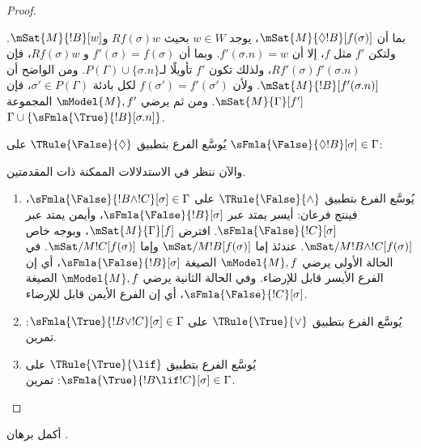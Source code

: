 \documentclass[../../../include/open-logic-section]{subfiles}
\begin{document}
\begin{proof}
\begin{enumerate}
{{  بما أن $\mSat{M}{\Diamond !B}[f(\sigma)]$، يوجد $w \in W$ بحيث
  $Rf(\sigma)w$ و$\mSat{M}{!B}[w]$. ولتكن $f'$ مثل $f$، إلا أن
  $f'(\sigma.n) = w$. وبما أن $f'(\sigma) = f(\sigma)$ و
  $Rf(\sigma)w$، فإن $Rf'(\sigma)f'(\sigma.n)$، ولذلك تكون $f'$
  تأويلًا لـ$P(\Gamma) \cup \{\sigma.n\}$. ومن الواضح أن
  $\mSat{M}{!B}[f'(\sigma.n)]$. ولأن $f(\sigma') = f'(\sigma')$ لكل
  بادئة $\sigma' \in P(\Gamma)$، فإن $\mSat{M}{\Gamma}[f']$. ومن ثم
  يرضي $\mModel{M}, f'$ المجموعة $\Gamma \cup
  \{\sFmla{\True}{!B}[\sigma.n]\}$.}
\item يُوسَّع الفرع بتطبيق $\TRule{\False}{\Diamond}$ على
  $\sFmla{\False}{\Diamond !B}[\sigma] \in \Gamma$:
  }{}
\end{enumerate}
والآن ننظر في الاستدلالات الممكنة ذات المقدمتين.
\begin{enumerate}
\item يُوسَّع الفرع بتطبيق $\TRule{\False}{\land}$ على
  $\sFmla{\False}{!B \land !C}[\sigma] \in \Gamma$، فينتج فرعان:
  أيسر يمتد عبر $\sFmla{\False}{!B}[\sigma]$، وأيمن يمتد عبر
  $\sFmla{\False}{!C}[\sigma]$. افترض $\mSat{M}{\Gamma}[f]$، وبوجه
  خاص $\mSat/{M}{!B \land !C}[f(\sigma)]$. عندئذ إما
  $\mSat/{M}{!B}[f(\sigma)]$ وإما $\mSat/{M}{!C}[f(\sigma)]$. في
  الحالة الأولى يرضي $\mModel{M}, f$ الصيغة
  $\sFmla{\False}{!B}[\sigma]$، أي إن الفرع الأيسر قابل للإرضاء. وفي
  الحالة الثانية يرضي $\mModel{M}, f$ الصيغة
  $\sFmla{\False}{!C}[\sigma]$، أي إن الفرع الأيمن قابل للإرضاء.
\item يُوسَّع الفرع بتطبيق $\TRule{\True}{\lor}$ على
    $\sFmla{\True}{!B \lor !C}[\sigma] \in \Gamma$: تمرين.
\item يُوسَّع الفرع بتطبيق $\TRule{\True}{\lif}$ على
    $\sFmla{\True}{!B \lif !C}[\sigma] \in \Gamma$: تمرين.
\end{enumerate}
\end{proof}

\begin{prob}
أكمل برهان .
\end{prob}
\end{document}

